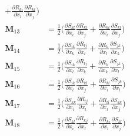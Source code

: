 \begin{subequations}
\begin{align}
				  	+ 
					 \frac{\partial R_{ki}}{\partial x_l} 
					 \frac{\partial R_{kl}}{\partial x_j} \bigg)  \\	
	\mathbf{M}_{13}  &= \frac{1}{2} 
			  \bigg( \frac{\partial S_{kl}}{\partial x_i}
					 \frac{\partial R_{kl}}{\partial x_j} 
				  	+ 
					 \frac{\partial R_{kl}}{\partial x_i}
					 \frac{\partial S_{kl}}{\partial x_j}  \bigg)  \\
	\mathbf{M}_{14}  &= \frac{1}{2} 
			  \bigg( \frac{\partial S_{ik}}{\partial x_k}
					 \frac{\partial R_{lj}}{\partial x_l} 
				  	+ 
					 \frac{\partial R_{li}}{\partial x_l} 
					 \frac{\partial S_{jk}}{\partial x_k} \bigg)  \\
	\mathbf{M}_{15}  &= \frac{1}{2} 
			  \bigg( \frac{\partial S_{ik}}{\partial x_l}
					 \frac{\partial R_{lj}}{\partial x_k} 
				  	+ 
					 \frac{\partial R_{li}}{\partial x_k} 
					 \frac{\partial S_{jk}}{\partial x_l} \bigg)  \\
	\mathbf{M}_{16}  &= \frac{1}{2} 
			  \bigg( \frac{\partial S_{ik}}{\partial x_l}
					 \frac{\partial R_{kl}}{\partial x_j} 
				  	+ 
					 \frac{\partial R_{kl}}{\partial x_i} 
					 \frac{\partial S_{jk}}{\partial x_l} \bigg)  \\
	\mathbf{M}_{17}  &= \frac{1}{2} 
			  \bigg( \frac{\partial S_{kk}}{\partial x_i}
					 \frac{\partial R_{lj}}{\partial x_l} 
				  	+ 
					 \frac{\partial R_{li}}{\partial x_l} 
					 \frac{\partial S_{kk}}{\partial x_j} \bigg)  \\	
	\mathbf{M}_{18}  &= \frac{1}{2} 
			  \bigg( \frac{\partial S_{kl}}{\partial x_i}
					 \frac{\partial R_{kj}}{\partial x_l} 
				  	+ 
					 \frac{\partial R_{ki}}{\partial x_l} 
					 \frac{\partial S_{kl}}{\partial x_j} \bigg)
\end{align}
\end{subequations}
%
%    

